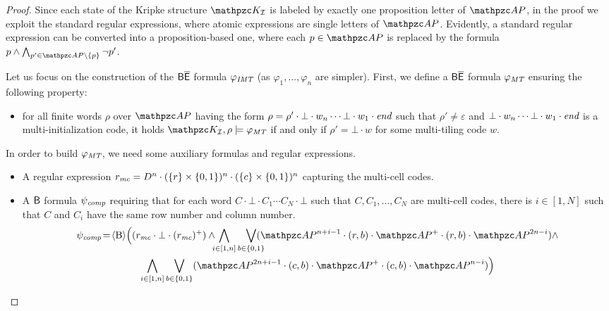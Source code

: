 \begin{proof}
Since each state of the Kripke structure $\Ku_\Instance$ is labeled by exactly one proposition letter of $\Prop$, in the proof we exploit the standard regular expressions, where atomic expressions are single letters of $\Prop$. Evidently, a standard regular expression can be converted into a proposition-based one, where each $p\in\Prop$ is replaced by the formula $p\wedge \bigwedge_{p'\in\Prop\setminus \{p\}}\neg p'$. 

Let us focus on the construction of the $\mathsf{B\overline{E}}$ formula $\varphi_{\textit{IMT}}$ (as $\varphi_1,\ldots,\varphi_n$ are simpler).
First, we define a $\mathsf{B\overline{E}}$ formula $\varphi_{\textit{MT}}$ ensuring the following property:
\begin{itemize}
  \item for all finite words $\rho$ over $\Prop$ having the form  $\rho =\rho' \cdot \bot \cdot w_n \cdots \bot \cdot w_1\cdot \textit{end}$ such that $\rho'\neq \varepsilon$ and
  $\bot \cdot w_n \cdots \bot \cdot w_1\cdot \textit{end}$ is a multi-initialization code, it holds $\Ku_\Instance,\rho\models\varphi_\MT$ if and only if
  $\rho'=\bot\cdot w$ for some multi-tiling code $w$.
\end{itemize}

In order to build $\varphi_{\textit{MT}}$, we need some auxiliary formulas and regular expressions.
%
\begin{itemize}
\item A regular expression $r_{\textit{mc}} = D^{n}\cdot (\{r\}\times \{0,1\})^{n}\cdot  (\{c\}\times \{0,1\})^{n}$ capturing the multi-cell codes.
\item    A $\mathsf{B}$ formula $\psi_{\textit{comp}}$ requiring that for each word $C\cdot   \bot \cdot C_1 \cdots C_N\cdot \bot$ such that
  $C, C_1,\ldots,C_N$ are multi-cell codes,
   there is $i\in [1,N]$ such that $C$ and $C_i$ have the same row number and column number.
\begin{multline*}
    \psi_{\Complete} \! = \! \hsB \Bigl((r_{\MC}\cdot \bot \cdot (r_{\MC})^{+}) \wedge \!\!\!
    \bigwedge_{i\in [1,n]}\bigvee_{b\in \{0,1\}}\!\!\!\!\!(\Prop^{n+i-1}\cdot (r,b) \cdot \Prop^{+}\cdot  (r,b)\cdot \Prop^{2n-i}) \wedge
    \\
     \bigwedge_{i\in [1,n]}\bigvee_{b\in \{0,1\}}(\Prop^{2n+i-1}\cdot (c,b) \cdot \Prop^{+}\cdot   (c,b)\cdot \Prop^{n-i})\Bigr)
\end{multline*}


\end{itemize}
\end{proof}
